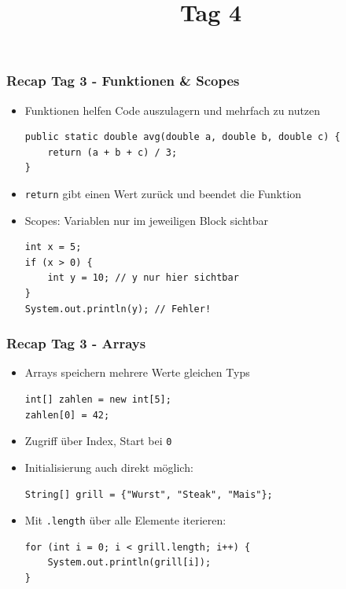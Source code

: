 \documentclass{../../presentation}
\title{\vkTitle\ Tag 4}
\author{\vkAuthors}
\institute{\vkInstitute}
\date{\vkDateDayFour}
\begin{document}
\begin{frame}
	\titlepage
\end{frame}

\begin{frame}[fragile]
	\frametitle{Recap Tag 3 - Funktionen \& Scopes}

	\begin{itemize}
		\item\pause Funktionen helfen Code auszulagern und mehrfach zu nutzen
		      \begin{verbatim}
public static double avg(double a, double b, double c) {
    return (a + b + c) / 3;
}
          \end{verbatim}
		\item\pause \texttt{return} gibt einen Wert zurück und beendet die Funktion
		\item\pause Scopes: Variablen nur im jeweiligen Block sichtbar
		      \begin{verbatim}
int x = 5;
if (x > 0) {
    int y = 10; // y nur hier sichtbar
}
System.out.println(y); // Fehler!
          \end{verbatim}
	\end{itemize}
\end{frame}

\begin{frame}[fragile]
	\frametitle{Recap Tag 3 - Arrays}
	\pause
	\begin{itemize}
		\item\pause Arrays speichern mehrere Werte gleichen Typs
		      \begin{verbatim}
int[] zahlen = new int[5];
zahlen[0] = 42;
          \end{verbatim}
		\item\pause Zugriff über Index, Start bei \texttt{0}
		\item\pause Initialisierung auch direkt möglich:
		      \begin{verbatim}
String[] grill = {"Wurst", "Steak", "Mais"};
          \end{verbatim}
		\item Mit \texttt{.length} über alle Elemente iterieren:
		      \begin{verbatim}
for (int i = 0; i < grill.length; i++) {
    System.out.println(grill[i]);
}
          \end{verbatim}
	\end{itemize}
\end{frame}
\end{document}
